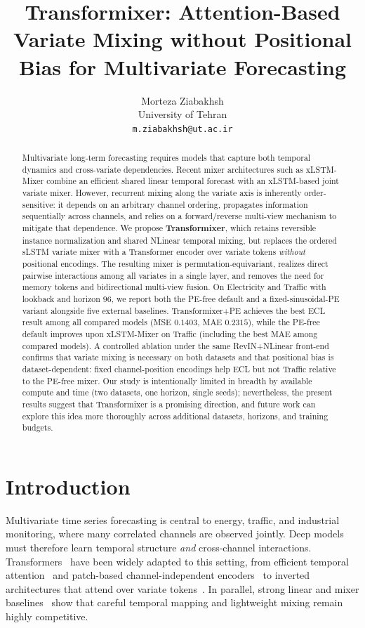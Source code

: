 \documentclass{article}
\title{Transformixer: Attention-Based Variate Mixing without Positional Bias for Multivariate Forecasting}
\author{
  Morteza Ziabakhsh\\
  University of Tehran\\
  \texttt{m.ziabakhsh@ut.ac.ir}
}
\begin{document}
\maketitle

\begin{abstract}
Multivariate long-term forecasting requires models that capture both temporal dynamics and cross-variate dependencies.
Recent mixer architectures such as xLSTM-Mixer combine an efficient shared linear temporal forecast with an xLSTM-based joint variate mixer.
However, recurrent mixing along the variate axis is inherently order-sensitive: it depends on an arbitrary channel ordering, propagates information sequentially across channels, and relies on a forward/reverse multi-view mechanism to mitigate that dependence.
We propose \textbf{Transformixer}, which retains reversible instance normalization and shared NLinear temporal mixing, but replaces the ordered sLSTM variate mixer with a Transformer encoder over variate tokens \emph{without} positional encodings.
The resulting mixer is permutation-equivariant, realizes direct pairwise interactions among all variates in a single layer, and removes the need for memory tokens and bidirectional multi-view fusion.
On Electricity and Traffic with lookback and horizon $96$, we report both the PE-free default and a fixed-sinusoidal-PE variant alongside five external baselines.
Transformixer+PE achieves the best ECL result among all compared models (MSE $0.1403$, MAE $0.2315$), while the PE-free default improves upon xLSTM-Mixer on Traffic (including the best MAE among compared models).
A controlled ablation under the same RevIN+NLinear front-end confirms that variate mixing is necessary on both datasets and that positional bias is dataset-dependent: fixed channel-position encodings help ECL but not Traffic relative to the PE-free mixer.
Our study is intentionally limited in breadth by available compute and time (two datasets, one horizon, single seeds); nevertheless, the present results suggest that Transformixer is a promising direction, and future work can explore this idea more thoroughly across additional datasets, horizons, and training budgets.
\end{abstract}

\section{Introduction}
\label{sec:intro}

Multivariate time series forecasting is central to energy, traffic, and industrial monitoring, where many correlated channels are observed jointly.
Deep models must therefore learn temporal structure \emph{and} cross-channel interactions.
Transformers~\citep{vaswani2017attention} have been widely adapted to this setting, from efficient temporal attention~\citep{zhou2021informer} and patch-based channel-independent encoders~\citep{nie2023patchtst} to inverted architectures that attend over variate tokens~\citep{liu2024itransformer}.
In parallel, strong linear and mixer baselines~\citep{zeng2023dlinear,li2023rlinear,kraus2024xlstmmixer} show that careful temporal mapping and lightweight mixing remain highly competitive.
\end{document}
